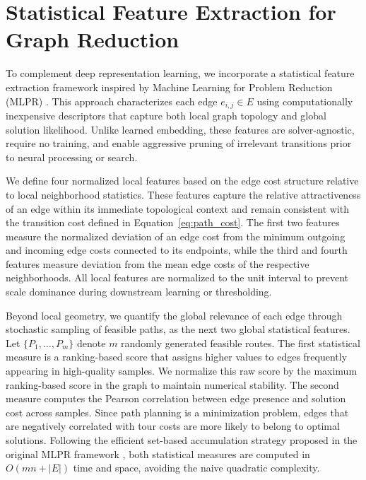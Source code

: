 \documentclass[10pt,twoside]{article}
\numberwithin{equation}{section}
\begin{document}
	




	\section{Statistical Feature Extraction for Graph Reduction}


	To complement deep representation learning, we incorporate a statistical feature extraction framework inspired by Machine Learning for Problem Reduction (MLPR) \cite{Sun:2021, Stodola:2025}. This approach characterizes each edge $e_{i,j} \in E$ using computationally inexpensive descriptors that capture both local graph topology and global solution likelihood. Unlike learned embedding, these features are solver-agnostic, require no training, and enable aggressive pruning of irrelevant transitions prior to neural processing or search.


	


	We define four normalized local features based on the edge cost structure relative to local neighborhood statistics. These features capture the relative attractiveness of an edge within its immediate topological context and remain consistent with the transition cost defined in Equation~\eqref{eq:path_cost}. The first two features measure the normalized deviation of an edge cost from the minimum outgoing and incoming edge costs connected to its endpoints, while the third and fourth features measure deviation from the mean edge costs of the respective neighborhoods. All local features are normalized to the unit interval to prevent scale dominance during downstream learning or thresholding. %


	


	Beyond local geometry, we quantify the global relevance of each edge through stochastic sampling of feasible paths, as the next two global statistical features. Let $\{P_1, \dots, P_m\}$ denote $m$ randomly generated feasible routes. The first statistical measure is a ranking-based score that assigns higher values to edges frequently appearing in high-quality samples. We normalize this raw score by the maximum ranking-based score in the graph to maintain numerical stability. The second measure computes the Pearson correlation between edge presence and solution cost across samples. Since path planning is a minimization problem, edges that are negatively correlated with tour costs are more likely to belong to optimal solutions. Following the efficient set-based accumulation strategy proposed in the original MLPR framework \cite{Sun:2021}, both statistical measures are computed in $O(mn + |E|)$ time and space, avoiding the naive quadratic complexity.
\end{document}
